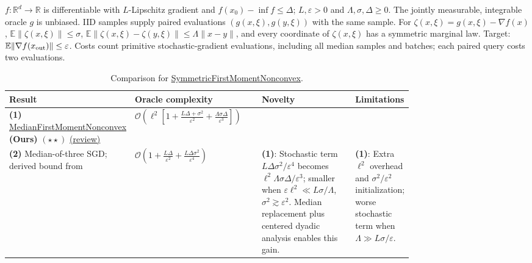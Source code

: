 \begin{table}[tp]
\centering
\caption{Comparison for \href{https://github.com/k3nfalt/longtails/blob/main/LongTails/Setups/SymmetricFirstMomentNonconvex.lean}{SymmetricFirstMomentNonconvex}.}\label{tab:SymmetricFirstMomentNonconvex}
\parbox{\linewidth}{\footnotesize
$f:\mathbb{R}^d\to\mathbb{R}$ is differentiable with $L$-Lipschitz gradient and $f(x_0)-\inf f\le\Delta$; $L,\varepsilon>0$ and $\Lambda,\sigma,\Delta\ge0$. The jointly measurable, integrable oracle $g$ is unbiased. IID samples supply paired evaluations $(g(x,\xi),g(y,\xi))$ with the same sample. For $\zeta(x,\xi)=g(x,\xi)-\nabla f(x)$, $\mathbb{E}\|\zeta(x,\xi)\|\le\sigma$, $\mathbb{E}\|\zeta(x,\xi)-\zeta(y,\xi)\|\le\Lambda\|x-y\|$, and every coordinate of $\zeta(x,\xi)$ has a symmetric marginal law. Target: $\mathbb{E}\|\nabla f(x_{\rm out})\|\le\varepsilon$. Costs count primitive stochastic-gradient evaluations, including all median samples and batches; each paired query costs two evaluations.}\par\smallskip
\begin{threeparttable}
\footnotesize
\setlength{\tabcolsep}{4pt}\renewcommand{\arraystretch}{1.25}
\begin{tabularx}{\linewidth}{@{}>{\raggedright\arraybackslash}p{0.20\linewidth}>{\raggedright\arraybackslash}p{0.32\linewidth}>{\raggedright\arraybackslash}p{0.25\linewidth}>{\raggedright\arraybackslash}X@{}}
\toprule
\textbf{Result} & \textbf{Oracle complexity} & \textbf{Novelty} & \textbf{Limitations} \\
\midrule
\textbf{(1)} \href{https://github.com/k3nfalt/longtails/blob/main/LongTails/Theorems/MedianFirstMomentNonconvex.lean}{Median\allowbreak First\allowbreak Moment\allowbreak Nonconvex} \textbf{(Ours)} $(\star\star)$ \href{https://github.com/k3nfalt/longtails/blob/main/scripts/reviews/MedianFirstMomentNonconvex.md}{(review)}
& $\mathcal{O}\!\left(\ell^2\left[1+\frac{L\Delta+\sigma^2}{\varepsilon^2}+\frac{\Lambda\sigma\Delta}{\varepsilon^3}\right]\right)$
& & \\
\midrule[1.2pt]
\textbf{(2)} Median-of-three SGD; derived bound from \citep[Cor.~2.2]{rvGhadimiLan2013v1}
& $\mathcal{O}\!\left(1+\frac{L\Delta}{\varepsilon^2}+\frac{L\Delta\sigma^2}{\varepsilon^4}\right)$
& \textbf{(1)}: Stochastic term $L\Delta\sigma^2/\varepsilon^4$ becomes $\ell^2\Lambda\sigma\Delta/\varepsilon^3$; smaller when $\varepsilon\ell^2\ll L\sigma/\Lambda$, $\sigma^2\gtrsim\varepsilon^2$. Median replacement plus centered dyadic analysis enables this gain.
& \textbf{(1)}: Extra $\ell^2$ overhead and $\sigma^2/\varepsilon^2$ initialization; worse stochastic term when $\Lambda\gg L\sigma/\varepsilon$. \\

\end{tabularx}
\end{threeparttable}
\end{table}
